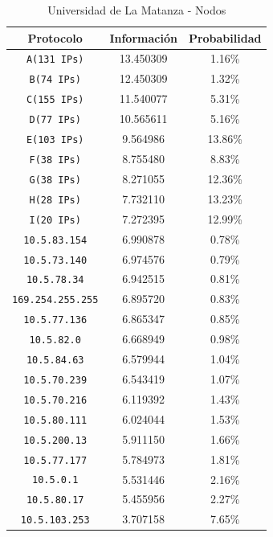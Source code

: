 \documentclass[final,inline,narroweqnarray,a4paper]{ieee}
\begin{document}
\begin{table}[H]
    \begin{center}
        \begin{tabular}{|c|c|c|}
            \hline
            \textbf{Protocolo} & \textbf{Información} & \textbf{Probabilidad} \\ \hline
            \texttt{A(131 IPs)}   &13.450309       & 1.16\%     \\ \hline
            \texttt{B(74 IPs)}    &12.450309       & 1.32\%     \\ \hline
            \texttt{C(155 IPs)}   &11.540077       & 5.31\%     \\ \hline
	        \texttt{D(77 IPs)}    &10.565611       & 5.16\%     \\ \hline
	        \texttt{E(103 IPs)}   &9.564986        & 13.86\%    \\ \hline
            \texttt{F(38 IPs)}    &8.755480        & 8.83\%     \\ \hline
    	    \texttt{G(38 IPs)}    &8.271055        & 12.36\%    \\ \hline
	        \texttt{H(28 IPs)}    &7.732110        & 13.23\%    \\ \hline
	        \texttt{I(20 IPs)}    &7.272395        & 12.99\%    \\ \hline
            \texttt{10.5.83.154}  &6.990878        & 0.78\%    \\ \hline
            \texttt{10.5.73.140}  &6.974576        & 0.79\%    \\ \hline
            \texttt{10.5.78.34}   &6.942515        & 0.81\%    \\ \hline
            \texttt{169.254.255.255} &6.895720     & 0.83\%    \\ \hline
            \texttt{10.5.77.136}  &6.865347        & 0.85\%    \\ \hline
            \texttt{10.5.82.0}    &6.668949        & 0.98\%    \\ \hline
            \texttt{10.5.84.63}   &6.579944        & 1.04\%    \\ \hline
            \texttt{10.5.70.239}  &6.543419        & 1.07\%    \\ \hline
            \texttt{10.5.70.216}  &6.119392        & 1.43\%    \\ \hline
            \texttt{10.5.80.111}  &6.024044        & 1.53\%    \\ \hline
            \texttt{10.5.200.13}  &5.911150        & 1.66\%    \\ \hline
            \texttt{10.5.77.177}  &5.784973        & 1.81\%    \\ \hline
            \texttt{10.5.0.1}     &5.531446        & 2.16\%    \\ \hline
            \texttt{10.5.80.17}   &5.455956        & 2.27\%    \\ \hline
            \texttt{10.5.103.253} &3.707158        & 7.65\%    \\ \hline    
        \end{tabular}
        \caption{Universidad de La Matanza - Nodos}
        \label{table:universidadLMS1}
    \end{center}
\end{table}
\end{document}
